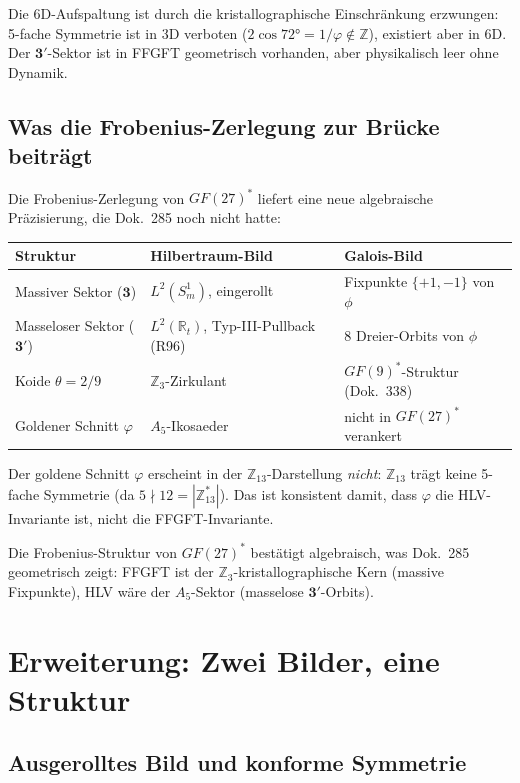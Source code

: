 Die 6D-Aufspaltung ist durch die kristallographische Einschränkung erzwungen:
5-fache Symmetrie ist in 3D verboten ($2\cos72°=1/\varphi\notin\mathbb{Z}$),
existiert aber in 6D. Der $\mathbf{3}'$-Sektor ist
in FFGFT geometrisch vorhanden, aber physikalisch leer ohne Dynamik.

\subsection{Was die Frobenius-Zerlegung zur Brücke beiträgt \KM}

Die Frobenius-Zerlegung von $GF(27)^*$ liefert eine neue algebraische
Präzisierung, die Dok.~285 noch nicht hatte:

\begin{center}
\renewcommand{\arraystretch}{1.3}
\begin{tabular}{lll}
\toprule
Struktur & Hilbertraum-Bild & Galois-Bild \\
\midrule
Massiver Sektor ($\mathbf{3}$) & $L^2(S^1_m)$, eingerollt & Fixpunkte $\{+1,-1\}$ von $\phi$ \\
Masseloser Sektor ($\mathbf{3}'$) & $L^2(\mathbb{R}_t)$, Typ-III-Pullback (R96) & 8 Dreier-Orbits von $\phi$ \\
Koide $\theta=2/9$ & $\mathbb{Z}_3$-Zirkulant & $GF(9)^*$-Struktur (Dok.~338) \\
Goldener Schnitt $\varphi$ & $A_5$-Ikosaeder & nicht in $GF(27)^*$ verankert \\
\bottomrule
\end{tabular}
\end{center}

Der goldene Schnitt $\varphi$ erscheint in der $\mathbb{Z}_{13}$-Darstellung
\emph{nicht}: $\mathbb{Z}_{13}$ trägt keine 5-fache Symmetrie (da
$5\nmid12=|\mathbb{Z}_{13}^*|$). Das ist konsistent damit,
dass $\varphi$ die HLV-Invariante ist, nicht die FFGFT-Invariante.

Die Frobenius-Struktur von $GF(27)^*$ bestätigt algebraisch, was Dok.~285
geometrisch zeigt: FFGFT ist der $\mathbb{Z}_3$-kristallographische Kern
(massive Fixpunkte), HLV wäre der $A_5$-Sektor (masselose $\mathbf{3}'$-Orbits).

\section{Erweiterung: Zwei Bilder, eine Struktur \KM}

\subsection{Ausgerolltes Bild und konforme Symmetrie}

